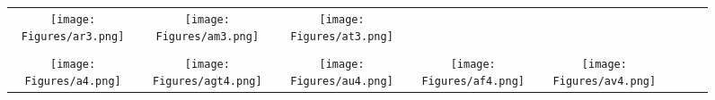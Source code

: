 \documentclass[journal]{IEEEtran}
\begin{document}
\begin{figure*}[!t]
\begin{tabular}{cccccccc}
		\hspace{0.4cm}
		\begin{minipage}{30pt}
			\texttt{[image: Figures/ar3.png]}
\end{minipage}
		&
		\hspace{0.4cm}
		\begin{minipage}{30pt}
			\texttt{[image: Figures/am3.png]}
\end{minipage}
		&
		\hspace{0.4cm}
		\begin{minipage}{30pt}
			\texttt{[image: Figures/at3.png]}
\end{minipage}
		\\
		\\
		\begin{minipage}{30pt}
			\texttt{[image: Figures/a4.png]}
\end{minipage}
		&
		\hspace{0.4cm}
		\begin{minipage}{30pt}
			\texttt{[image: Figures/agt4.png]}
\end{minipage}
		&
		\hspace{0.4cm}
		\begin{minipage}{30pt}
			\texttt{[image: Figures/au4.png]}
\end{minipage}
		&
		\hspace{0.4cm}
		\begin{minipage}{30pt}
			\texttt{[image: Figures/af4.png]}
\end{minipage}
		&
		\hspace{0.4cm}
		\begin{minipage}{30pt}
			\texttt{[image: Figures/av4.png]}
\end{minipage}
	

\end{tabular}
\end{figure*}
\end{document}
